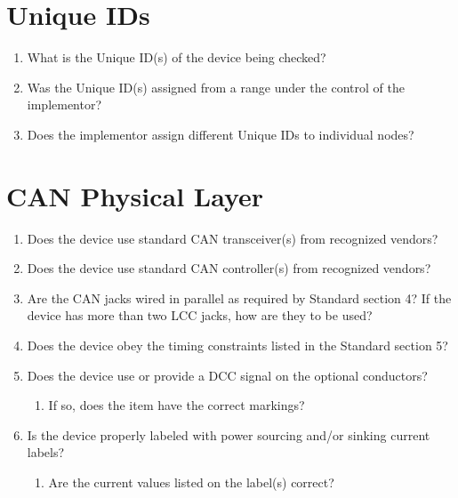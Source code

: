 \section{Unique IDs}
    \begin{enumerate}
        \item What is the Unique ID(s) of the device being checked?
        \item Was the Unique ID(s) assigned from a range under the control of the implementor? 
        \item Does the implementor assign different Unique IDs to individual nodes?
    \end{enumerate}

\section{CAN Physical Layer}
    \begin{enumerate}
        \item Does the device use standard CAN transceiver(s) from recognized vendors?
        \item Does the device use standard CAN controller(s) from recognized vendors?
        \item Are the CAN jacks wired in parallel as required by Standard section 4?
            If the device has more than two LCC jacks, how are they to be used?
        \item Does the device obey the timing constraints listed in the Standard section 5?
        \item Does the device use or provide a DCC signal on the optional conductors?
            \begin{enumerate}
                \item If so, does the item have the correct markings?
            \end{enumerate}
        \item Is the device properly labeled with power sourcing and/or sinking current labels?
            \begin{enumerate}
                \item Are the current values listed on the label(s) correct?
            \end{enumerate}
    \end{enumerate}

